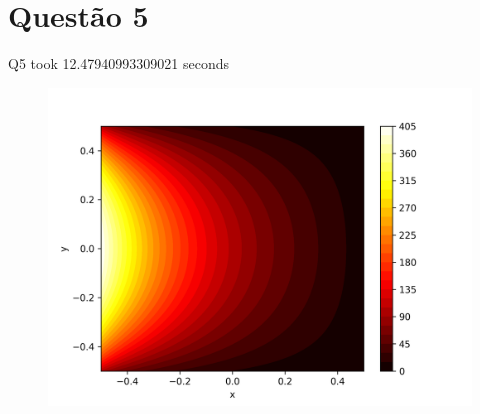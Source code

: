 \documentclass{article}
\begin{document}
\section{Questão 5}
Q5 took 12.47940993309021 seconds
\begin{figure}[h]
\centering
  \includegraphics[width=.8\textwidth]{figs/q5_colorbar.png}
	\label{fig:q5_colobar}
\end{figure}
\end{document}
